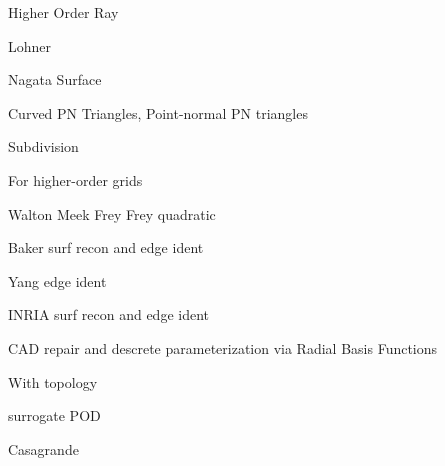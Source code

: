 \documentclass{article}
\begin{document}
Higher Order Ray\cite{ray-delany-einstein-jiao-robust-ho-surf-recon-remesh}

Lohner\cite{lohner-regridding-surface}
\cite{kim-takano-nakahashi-adjoint-adapt,kim-nakahashi-adjoint-adapt-viscous}

Nagata Surface \cite{nagata-surface-recon-interp-normal}

Curved PN Triangles,
Point-normal PN triangles\cite{vlachos-curved-pn-triangles}

Subdivision\cite{haimes-imr15-subdivision}

For higher-order grids\cite{unstruct-3d-ho-grid-dg-surf-recon}
\cite{jiao-wang-resonstruct-ho-surf}

Walton Meek\cite{walton-meek-g1-tri-patch-recovery-bound-curve}
Frey\cite{frey-imr9-about-surface-remeshing}
Frey quadratic\cite{dapogny-dobrzynski-frey-3d-adapt-surf-recon}

Baker surf recon and edge ident\cite{baker-imr13}

Yang edge ident\cite{yang-zheng-wang-joint-line-detection-tri}

INRIA surf recon and edge ident\cite{borouchaki-surface-reconstruction}

CAD repair and descrete parameterization via Radial Basis Functions
\cite{cad-repair-discrete-param-rbf}

With topology\cite{lepage-habashi-cad-reconstruction}

surrogate POD\cite{bobrowski-surrogate-geom-pod-adj-opt}

Casagrande\cite{casagrande-phd-para-adapt-recon}
\cite{casagrande-para-adapt-geom-preserve-surf}



\end{document}
